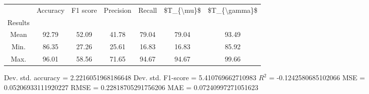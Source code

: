 \begin{tabular}{|c|c|c|c|c|c|c|}
\toprule
{} &  Accuracy &  F1 score &  Precision &  Recall &  \$T\_\{\textbackslash mu\}\$ &  \$T\_\{\textbackslash gamma\}\$ \\
Results &           &           &            &         &            &               \\
\hline
Mean    &     92.79 &     52.09 &      41.78 &   79.04 &      79.04 &         93.49 \\
Min.    &     86.35 &     27.26 &      25.61 &   16.83 &      16.83 &         85.92 \\
Max.    &     96.01 &     58.56 &      71.65 &   94.67 &      94.67 &         99.66 \\
\bottomrule
\end{tabular}

 Dev. std. accuracy = 2.2216051968186648
 Dev. std. F1-score = 5.410769662710983
 $R^2$ = -0.1242580685102066
 MSE = 0.05206933111920227
 RMSE = 0.22818705291756206
 MAE = 0.07240997271051623